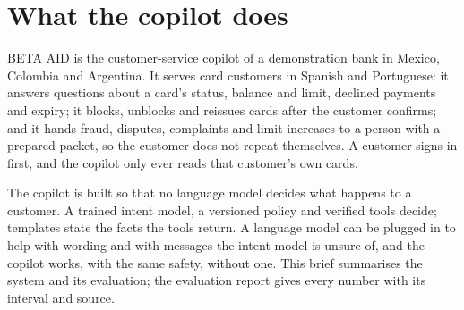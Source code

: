 \section{What the copilot does}

BETA AID is the customer-service copilot of a demonstration bank in Mexico, Colombia and Argentina. It serves card
customers in Spanish and Portuguese: it answers questions about a card's status, balance and limit, declined
payments and expiry; it blocks, unblocks and reissues cards after the customer confirms; and it hands fraud,
disputes, complaints and limit increases to a person with a prepared packet, so the customer does not repeat
themselves. A customer signs in first, and the copilot only ever reads that customer's own cards.

The copilot is built so that no language model decides what happens to a customer. A trained intent model, a
versioned policy and verified tools decide; templates state the facts the tools return. A language model can be
plugged in to help with wording and with messages the intent model is unsure of, and the copilot works, with the same
safety, without one. This brief summarises the system and its evaluation; the evaluation report gives every number
with its interval and source.
